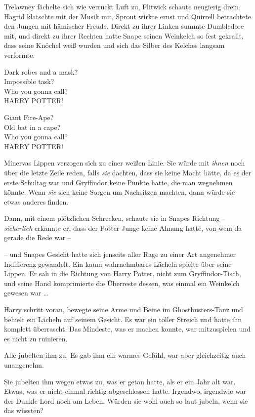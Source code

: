 {Trelawney fächelte sich wie verrückt Luft zu, Flitwick schaute neugierig drein, Hagrid klatschte mit der Musik mit, Sprout wirkte ernst und Quirrell betrachtete den Jungen mit hämischer Freude. Direkt zu ihrer Linken summte Dumbledore mit, und direkt zu ihrer Rechten hatte Snape seinen Weinkelch so fest gekrallt, dass seine Knöchel weiß wurden und sich das Silber des Kelches langsam verformte.

Dark robes and a mask?\\ Impossible task?\\ Who you gonna call?\\ HARRY POTTER!

Giant Fire-Ape?\\ Old bat in a cape?\\ Who you gonna call?\\ HARRY POTTER!

Minervas Lippen verzogen sich zu einer weißen Linie. Sie würde mit \emph{ihnen} noch über die letzte Zeile reden, falls \emph{sie} dachten, dass sie keine Macht hätte, da es der erste Schultag war und Gryffindor keine Punkte hatte, die man wegnehmen könnte. Wenn \emph{sie} sich keine Sorgen um Nachsitzen machten, dann würde sie etwas anderes finden.

Dann, mit einem plötzlichen Schrecken, schaute sie in Snapes Richtung -- \emph{sicherlich} erkannte er, dass der Potter-Junge keine Ahnung hatte, von wem da gerade die Rede war --

-- und Snapes Gesicht hatte sich jenseits aller Rage zu einer Art angenehmer Indifferenz gewandelt. Ein kaum wahrnehmbares Lächeln spielte über seine Lippen. Er sah in die Richtung von Harry Potter, nicht zum Gryffindor-Tisch, und seine Hand komprimierte die Überreste dessen, was einmal ein Weinkelch gewesen war …

Harry schritt voran, bewegte seine Arme und Beine im Ghostbusters-Tanz und behielt ein Lächeln auf seinem Gesicht. Es war ein toller Streich und hatte ihn komplett überrascht. Das Mindeste, was er machen konnte, war mitzuspielen und es nicht zu ruinieren.

Alle jubelten ihm zu. Es gab ihm ein warmes Gefühl, war aber gleichzeitig auch unangenehm.

Sie jubelten ihm wegen etwas zu, was er getan hatte, als er ein Jahr alt war. Etwas, was er nicht einmal richtig abgeschlossen hatte. Irgendwo, irgendwie war der Dunkle Lord noch am Leben. Würden sie wohl auch so laut jubeln, wenn sie das wüssten?

}
